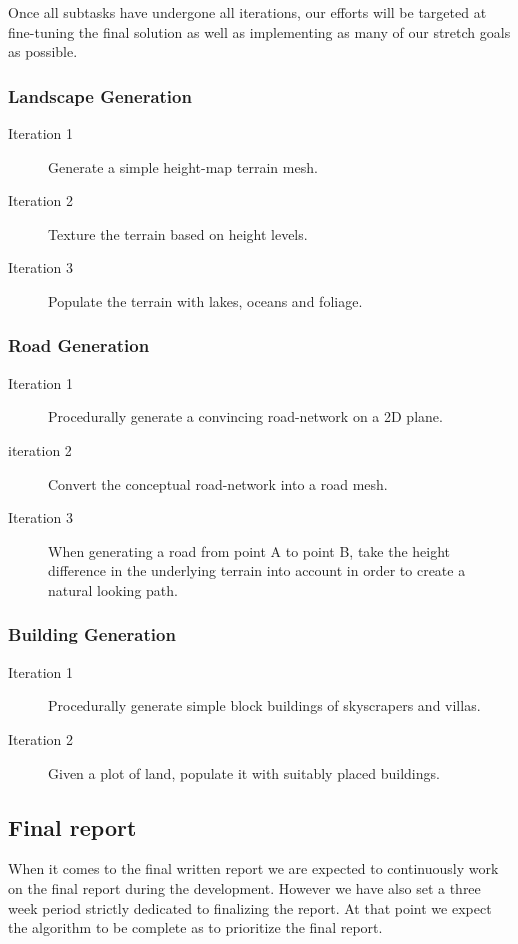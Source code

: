 Once all subtasks have undergone all iterations, our efforts will be targeted at fine-tuning the final solution as well as implementing as many of our stretch goals as possible.

\subsubsection{Landscape Generation}
\begin{description}
  \item[Iteration 1] Generate a simple height-map terrain mesh.
  \item[Iteration 2] Texture the terrain based on height levels.
  \item[Iteration 3] Populate the terrain with lakes, oceans and foliage.
\end{description}

\subsubsection{Road Generation}
\begin{description}
  \item[Iteration 1] Procedurally generate a convincing road-network on a 2D plane.
  \item[iteration 2] Convert the conceptual road-network into a road mesh.
  \item[Iteration 3] When generating a road from point A to point B, take the height difference in the underlying terrain into account in order to create a natural looking path.
\end{description}

\subsubsection{Building Generation}
\begin{description}
  \item[Iteration 1] Procedurally generate simple block buildings of skyscrapers and villas.
  \item[Iteration 2] Given a plot of land, populate it with suitably placed buildings.
\end{description}

\subsection{Final report}
When it comes to the final written report we are expected to continuously work on the final report during the development.
However we have also set a three week period strictly dedicated to finalizing the report.
At that point we expect the algorithm to be complete as to prioritize the final report.

